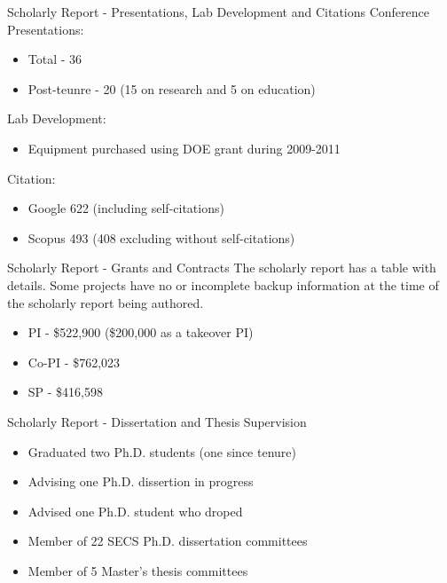 \documentclass{beamer}
\begin{document}
\begin{frame}{Scholarly Report - Presentations, Lab Development and Citations}
Conference Presentations:
\begin{itemize}
  \item Total - 36
  \item Post-teunre - 20 (15 on research and 5 on education)
\end{itemize}

Lab Development: 
\begin{itemize}
  \item Equipment purchased using DOE grant during 2009-2011
\end{itemize}

Citation: 
\begin{itemize}
  \item Google 622 (including self-citations)
  \item Scopus 493 (408 excluding without self-citations)
\end{itemize}

\end{frame}

\begin{frame}{Scholarly Report - Grants and Contracts} 
The scholarly report has a table with details. 
Some projects have no or incomplete backup information at the time of the scholarly report being authored. 
\begin{itemize}
  \item PI - \$522,900 (\$200,000 as a takeover PI) 
  \item Co-PI - \$762,023
  \item SP - \$416,598
\end{itemize}
\end{frame}

\begin{frame}{Scholarly Report - Dissertation and Thesis Supervision}
\begin{itemize}
  \item Graduated two Ph.D. students (one since tenure)
  \item Advising one Ph.D. dissertion in progress
  \item Advised one Ph.D. student who droped
  \item Member of 22 SECS Ph.D. dissertation committees
  \item Member of 5 Master's thesis committees  
\end{itemize} 
\end{frame}
\end{document}
